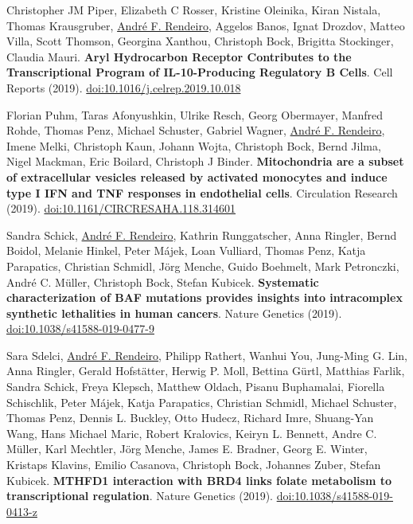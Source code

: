 \documentclass[11pt,a4paper,roman]{moderncv} %
\begin{document}
\begin{etaremune}[leftmargin=1.0cm, itemindent=0pt, topsep=10pt, itemsep=2pt, partopsep=0pt, parsep=0pt]
        \item Christopher JM Piper, Elizabeth C Rosser, Kristine Oleinika, Kiran Nistala, Thomas Krausgruber, \underline{André F. Rendeiro}, Aggelos Banos, Ignat Drozdov, Matteo Villa, Scott Thomson, Georgina Xanthou, Christoph Bock, Brigitta Stockinger, Claudia Mauri. \textbf{Aryl Hydrocarbon Receptor Contributes to the Transcriptional Program of IL-10-Producing Regulatory B Cells}. Cell Reports (2019).
        \href{https://dx.doi.org/10.1016/j.celrep.2019.10.018}{doi:10.1016/j.celrep.2019.10.018}

        \item Florian Puhm, Taras Afonyushkin, Ulrike Resch, Georg Obermayer, Manfred Rohde, Thomas Penz, Michael Schuster, Gabriel Wagner, \underline{André F. Rendeiro}, Imene Melki, Christoph Kaun, Johann Wojta, Christoph Bock, Bernd Jilma, Nigel Mackman, Eric Boilard, Christoph J Binder. \textbf{Mitochondria are a subset of extracellular vesicles released by activated monocytes and induce type I IFN and TNF responses in endothelial cells}. Circulation Research (2019).
        \href{https://dx.doi.org/10.1161/CIRCRESAHA.118.314601}{doi:10.1161/CIRCRESAHA.118.314601}

        \item Sandra Schick, \underline{André F. Rendeiro}, Kathrin Runggatscher, Anna Ringler, Bernd Boidol, Melanie Hinkel, Peter Májek, Loan Vulliard, Thomas Penz, Katja Parapatics, Christian Schmidl, Jörg Menche, Guido Boehmelt, Mark Petronczki, André C. Müller, Christoph Bock, Stefan Kubicek. \textbf{Systematic characterization of BAF mutations provides insights into intracomplex synthetic lethalities in human cancers}. Nature Genetics (2019).
        \href{https://dx.doi.org/10.1038/s41588-019-0477-9}{doi:10.1038/s41588-019-0477-9}

        \item Sara Sdelci, \underline{André F. Rendeiro}, Philipp Rathert, Wanhui You, Jung-Ming G. Lin, Anna Ringler, Gerald Hofstätter, Herwig P. Moll, Bettina Gürtl, Matthias Farlik, Sandra Schick, Freya Klepsch, Matthew Oldach, Pisanu Buphamalai, Fiorella Schischlik, Peter Májek, Katja Parapatics, Christian Schmidl, Michael Schuster, Thomas Penz, Dennis L. Buckley, Otto Hudecz, Richard Imre, Shuang-Yan Wang, Hans Michael Maric, Robert Kralovics, Keiryn L. Bennett, Andre C. Müller, Karl Mechtler, Jörg Menche, James E. Bradner, Georg E. Winter, Kristaps Klavins, Emilio Casanova, Christoph Bock, Johannes Zuber, Stefan Kubicek. \textbf{MTHFD1 interaction with BRD4 links folate metabolism to transcriptional regulation}. Nature Genetics (2019).
        \href{https://dx.doi.org/10.1038/s41588-019-0413-z}{doi:10.1038/s41588-019-0413-z}


\end{etaremune}
\end{document}
